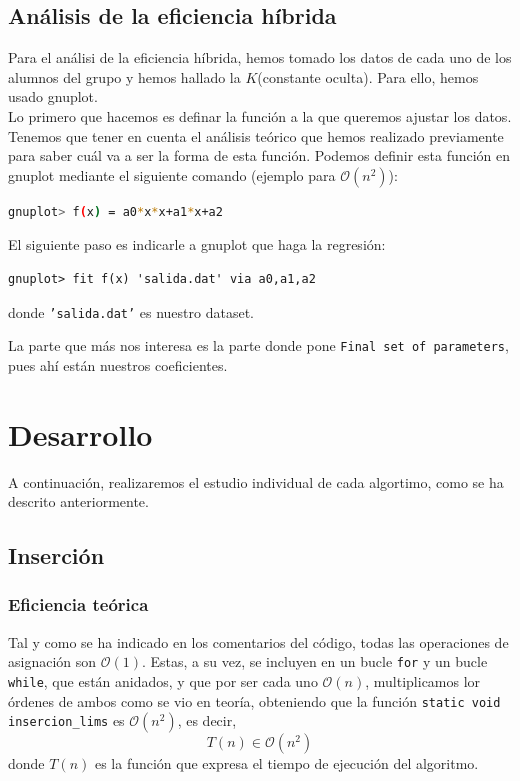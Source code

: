\documentclass[10pt,a4paper]{article}
\begin{document}
\subsection{Análisis de la eficiencia híbrida}
Para el análisi de la eficiencia híbrida, hemos tomado los datos de cada uno de los alumnos del grupo y hemos hallado la \(K\)(constante oculta). Para ello, hemos usado gnuplot. \\

Lo primero que hacemos es definar la función a la que queremos ajustar los datos. Tenemos que tener en cuenta el análisis teórico que hemos realizado previamente para saber cuál va a ser la forma de esta función. Podemos definir esta función en gnuplot mediante el siguiente comando (ejemplo para \(\mathcal{O}(n^2)\)):
\begin{lstlisting}[language=bash]
gnuplot> f(x) = a0*x*x+a1*x+a2
\end{lstlisting}

El siguiente paso es indicarle a gnuplot que haga la regresión:
\begin{lstlisting}
gnuplot> fit f(x) 'salida.dat' via a0,a1,a2
\end{lstlisting}
donde \texttt{'salida.dat'} es nuestro dataset. 

La parte que más nos interesa es la parte donde pone \texttt{Final set of parameters}, pues ahí están nuestros coeficientes.

\section{Desarrollo}

A continuación, realizaremos el estudio individual de cada algortimo, como se ha descrito anteriormente.

\subsection{Inserción}
\scalebox{0.75}{

}

\subsubsection{Eficiencia teórica}
Tal y como se ha indicado en los comentarios del código, todas las operaciones de asignación son \(\mathcal{O}(1)\). Estas, a su vez, se incluyen en un bucle \texttt{for} y un bucle \texttt{while}, que están anidados, y que por ser cada uno \(\mathcal{O}(n)\), multiplicamos lor órdenes de ambos como se vio en teoría, obteniendo que la función \texttt{static void insercion\_lims} es \(\mathcal{O}(n^2)\), es decir,
\[
T(n) \in \mathcal{O}(n^2)
\]
donde \(T(n)\) es la función que expresa el tiempo de ejecución del algoritmo.
\end{document}
